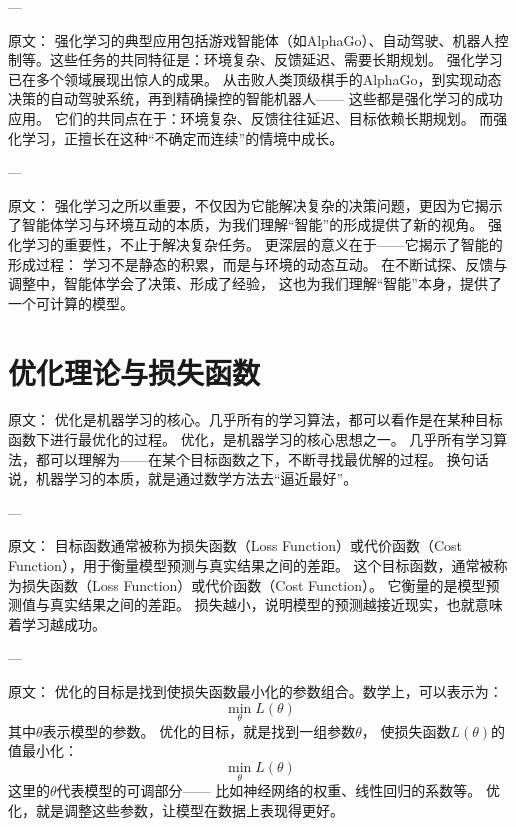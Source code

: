 ---

原文：
强化学习的典型应用包括游戏智能体（如AlphaGo）、自动驾驶、机器人控制等。这些任务的共同特征是：环境复杂、反馈延迟、需要长期规划。
强化学习已在多个领域展现出惊人的成果。  
从击败人类顶级棋手的AlphaGo，到实现动态决策的自动驾驶系统，再到精确操控的智能机器人——  
这些都是强化学习的成功应用。  
它们的共同点在于：环境复杂、反馈往往延迟、目标依赖长期规划。  
而强化学习，正擅长在这种“不确定而连续”的情境中成长。

---

原文：
强化学习之所以重要，不仅因为它能解决复杂的决策问题，更因为它揭示了智能体学习与环境互动的本质，为我们理解“智能”的形成提供了新的视角。
强化学习的重要性，不止于解决复杂任务。  
更深层的意义在于——它揭示了智能的形成过程：  
学习不是静态的积累，而是与环境的动态互动。  
在不断试探、反馈与调整中，智能体学会了决策、形成了经验，  
这也为我们理解“智能”本身，提供了一个可计算的模型。

\section{优化理论与损失函数}

原文：
优化是机器学习的核心。几乎所有的学习算法，都可以看作是在某种目标函数下进行最优化的过程。
优化，是机器学习的核心思想之一。  
几乎所有学习算法，都可以理解为——在某个目标函数之下，不断寻找最优解的过程。  
换句话说，机器学习的本质，就是通过数学方法去“逼近最好”。

---

原文：
目标函数通常被称为损失函数（Loss Function）或代价函数（Cost Function），用于衡量模型预测与真实结果之间的差距。
这个目标函数，通常被称为损失函数（Loss Function）或代价函数（Cost Function）。  
它衡量的是模型预测值与真实结果之间的差距。  
损失越小，说明模型的预测越接近现实，也就意味着学习越成功。

---

原文：
优化的目标是找到使损失函数最小化的参数组合。数学上，可以表示为：
$$
\min_{\theta} L(\theta)
$$
其中$\theta$表示模型的参数。
优化的目标，就是找到一组参数$\theta$，  
使损失函数$L(\theta)$的值最小化：
$$
\min_{\theta} L(\theta)
$$  
这里的$\theta$代表模型的可调部分——  
比如神经网络的权重、线性回归的系数等。  
优化，就是调整这些参数，让模型在数据上表现得更好。

